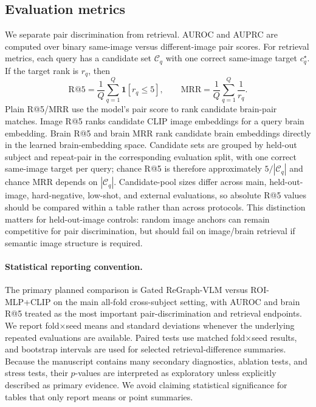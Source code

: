 \documentclass{article}
\begin{document}
\subsection{Evaluation metrics}

We separate pair discrimination from retrieval. AUROC and AUPRC are computed over binary same-image versus different-image pair scores. For retrieval metrics, each query has a candidate set $\mathcal{C}_q$ with one correct same-image target $c_q^\star$. If the target rank is $r_q$, then
\begin{equation}
  \mathrm{R@5}=\frac{1}{Q}\sum_{q=1}^{Q}\mathbf{1}[r_q\leq5],
  \qquad
  \mathrm{MRR}=\frac{1}{Q}\sum_{q=1}^{Q}\frac{1}{r_q}.
\end{equation}
Plain R@5/MRR use the model's pair score to rank candidate brain-pair matches. Image R@5 ranks candidate CLIP image embeddings for a query brain embedding. Brain R@5 and brain MRR rank candidate brain embeddings directly in the learned brain-embedding space. Candidate sets are grouped by held-out subject and repeat-pair in the corresponding evaluation split, with one correct same-image target per query; chance R@5 is therefore approximately $5/|\mathcal{C}_q|$ and chance MRR depends on $|\mathcal{C}_q|$. Candidate-pool sizes differ across main, held-out-image, hard-negative, low-shot, and external evaluations, so absolute R@5 values should be compared within a table rather than across protocols. This distinction matters for held-out-image controls: random image anchors can remain competitive for pair discrimination, but should fail on image/brain retrieval if semantic image structure is required.

\paragraph{Statistical reporting convention.}
The primary planned comparison is Gated ReGraph-VLM versus ROI-MLP+CLIP on the main all-fold cross-subject setting, with AUROC and brain R@5 treated as the most important pair-discrimination and retrieval endpoints. We report fold$\times$seed means and standard deviations whenever the underlying repeated evaluations are available. Paired tests use matched fold$\times$seed results, and bootstrap intervals are used for selected retrieval-difference summaries. Because the manuscript contains many secondary diagnostics, ablation tests, and stress tests, their $p$-values are interpreted as exploratory unless explicitly described as primary evidence. We avoid claiming statistical significance for tables that only report means or point summaries.
\end{document}
